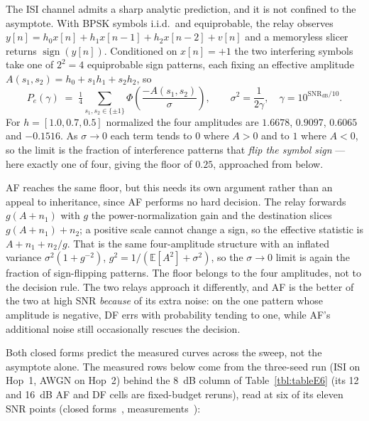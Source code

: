 \begin{itemize}
\end{itemize}

The ISI channel admits a sharp analytic prediction, and it is not confined to the asymptote. With BPSK symbols i.i.d.\ and equiprobable, the relay observes $y[n] = h_0 x[n] + h_1 x[n-1] + h_2 x[n-2] + v[n]$ and a memoryless slicer returns $\operatorname{sign}(y[n])$. Conditioned on $x[n]=+1$ the two interfering symbols take one of $2^{2}=4$ equiprobable sign patterns, each fixing an effective amplitude $A(s_1,s_2) = h_0 + s_1 h_1 + s_2 h_2$, so
\begin{equation}\label{eq:slicer-floor}
P_e(\gamma) \;=\; \tfrac{1}{4}\!\!\sum_{s_1,s_2 \in \{\pm 1\}}\!\! \Phi\!\left(\frac{-A(s_1,s_2)}{\sigma}\right),
\qquad \sigma^{2} = \frac{1}{2\gamma},\quad \gamma = 10^{\mathrm{SNR_{dB}}/10}.
\end{equation}
For $h = [1.0, 0.7, 0.5]$ normalized the four amplitudes are $1.6678$, $0.9097$, $0.6065$ and $-0.1516$. As $\sigma \to 0$ each term tends to $0$ where $A>0$ and to $1$ where $A<0$, so the limit is the fraction of interference patterns that \emph{flip the symbol sign} --- here exactly one of four, giving the floor of $0.25$, approached from below.

AF reaches the same floor, but this needs its own argument rather than an appeal to inheritance, since AF performs no hard decision. The relay forwards $g(A + n_1)$ with $g$ the power-normalization gain and the destination slices $g(A + n_1) + n_2$; a positive scale cannot change a sign, so the effective statistic is $A + n_1 + n_2/g$. That is the same four-amplitude structure with an inflated variance $\sigma^{2}(1 + g^{-2})$, $g^{2} = 1/(\mathbb{E}[A^{2}] + \sigma^{2})$, so the $\sigma \to 0$ limit is again the fraction of sign-flipping patterns. The floor belongs to the four amplitudes, not to the decision rule. The two relays approach it differently, and AF is the better of the two at high SNR \emph{because} of its extra noise: on the one pattern whose amplitude is negative, DF errs with probability tending to one, while AF's additional noise still occasionally rescues the decision.

Both closed forms predict the measured curves across the sweep, not the asymptote alone. The measured rows below come from the three-seed run (ISI on Hop~1, AWGN on Hop~2) behind the 8~dB column of Table~\ref{tbl:tableE6} (its 12 and 16~dB AF and DF cells are fixed-budget reruns), read at six of its eleven SNR points (closed forms~, measurements~):

